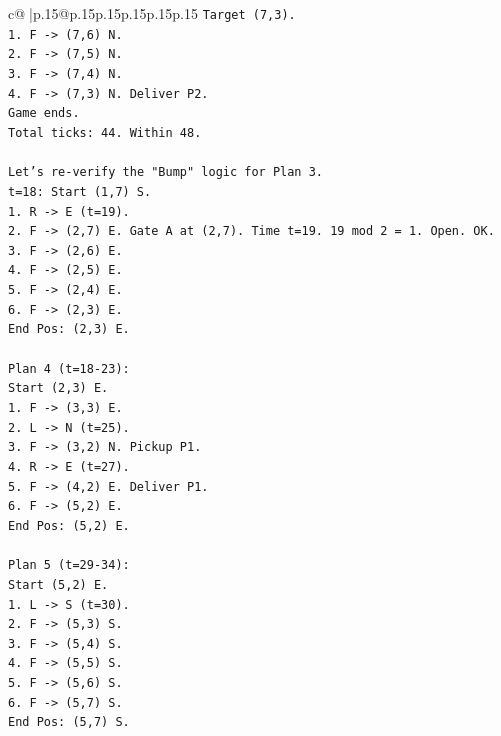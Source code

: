 \documentclass{article}
\begin{document}
{\begin{supertabular}{c@{$\;$}|p{.15\linewidth}@{}p{.15\linewidth}p{.15\linewidth}p{.15\linewidth}p{.15\linewidth}p{.15\linewidth}}
{{{\texttt{Target (7,3).} \\
\texttt{1. F {-}> (7,6) N.} \\
\texttt{2. F {-}> (7,5) N.} \\
\texttt{3. F {-}> (7,4) N.} \\
\texttt{4. F {-}> (7,3) N. Deliver P2.} \\
\texttt{Game ends.} \\
\texttt{Total ticks: 44. Within 48.} \\
\\ 
\texttt{Let's re{-}verify the "Bump" logic for Plan 3.} \\
\texttt{t=18: Start (1,7) S.} \\
\texttt{1. R {-}> E (t=19).} \\
\texttt{2. F {-}> (2,7) E. Gate A at (2,7). Time t=19. 19 mod 2 = 1. Open. OK.} \\
\texttt{3. F {-}> (2,6) E.} \\
\texttt{4. F {-}> (2,5) E.} \\
\texttt{5. F {-}> (2,4) E.} \\
\texttt{6. F {-}> (2,3) E.} \\
\texttt{End Pos: (2,3) E.} \\
\\ 
\texttt{Plan 4 (t=18{-}23):} \\
\texttt{Start (2,3) E.} \\
\texttt{1. F {-}> (3,3) E.} \\
\texttt{2. L {-}> N (t=25).} \\
\texttt{3. F {-}> (3,2) N. Pickup P1.} \\
\texttt{4. R {-}> E (t=27).} \\
\texttt{5. F {-}> (4,2) E. Deliver P1.} \\
\texttt{6. F {-}> (5,2) E.} \\
\texttt{End Pos: (5,2) E.} \\
\\ 
\texttt{Plan 5 (t=29{-}34):} \\
\texttt{Start (5,2) E.} \\
\texttt{1. L {-}> S (t=30).} \\
\texttt{2. F {-}> (5,3) S.} \\
\texttt{3. F {-}> (5,4) S.} \\
\texttt{4. F {-}> (5,5) S.} \\
\texttt{5. F {-}> (5,6) S.} \\
\texttt{6. F {-}> (5,7) S.} \\
\texttt{End Pos: (5,7) S.} \\
}}}
\end{supertabular}}
\end{document}
